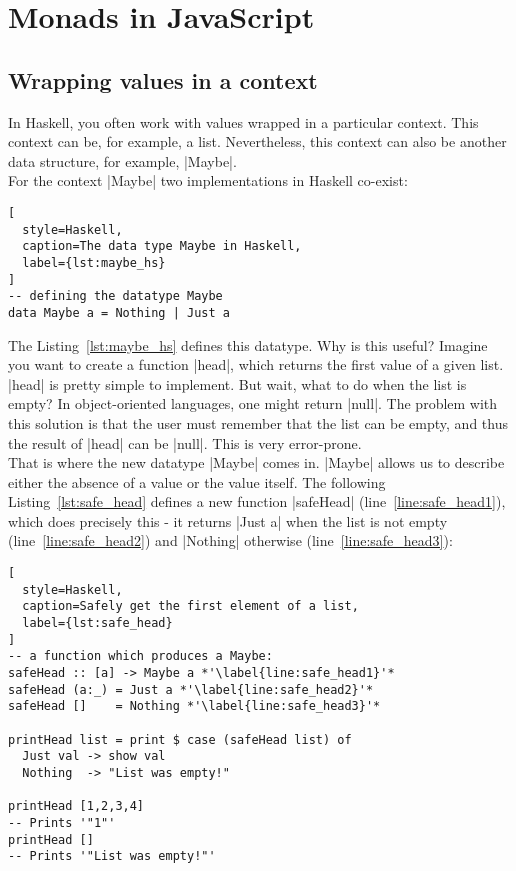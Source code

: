 \section{Monads in JavaScript} %
\label{sec:Monads in JavaScript}

\subsection{Wrapping values in a context} %
\label{sub:Wrapping values in a context}

In Haskell, you often work with values wrapped in a particular context. This
context can be, for example, a list. Nevertheless, this context can also be
another data structure, for example, |Maybe|. \\
For the context |Maybe| two implementations in Haskell co-exist:

\begin{lstlisting}[
  style=Haskell,
  caption=The data type Maybe in Haskell,
  label={lst:maybe_hs}
]
-- defining the datatype Maybe
data Maybe a = Nothing | Just a
\end{lstlisting}

The Listing~\ref{lst:maybe_hs} defines this datatype. Why is this useful?
Imagine you want to create a function |head|, which returns the first value of
a given list. |head| is pretty simple to implement. But wait, what to do when
the list is empty? In object-oriented languages, one might return |null|. The
problem with this solution is that the user must remember that the list can be
empty, and thus the result of |head| can be |null|. This is very error-prone.
\\

That is where the new datatype |Maybe| comes in. |Maybe| allows us to describe
either the absence of a value or the value itself. The following
Listing~\ref{lst:safe_head} defines a new function |safeHead|
(line~\ref{line:safe_head1}), which does
precisely this - it returns |Just a| when the list is not empty
(line~\ref{line:safe_head2}) and |Nothing| otherwise (line~\ref{line:safe_head3}):

\begin{lstlisting}[
  style=Haskell,
  caption=Safely get the first element of a list,
  label={lst:safe_head}
]
-- a function which produces a Maybe:
safeHead :: [a] -> Maybe a *'\label{line:safe_head1}'*
safeHead (a:_) = Just a *'\label{line:safe_head2}'*
safeHead []    = Nothing *'\label{line:safe_head3}'*

printHead list = print $ case (safeHead list) of 
  Just val -> show val
  Nothing  -> "List was empty!"

printHead [1,2,3,4]
-- Prints '"1"'
printHead []
-- Prints '"List was empty!"'
\end{lstlisting}

